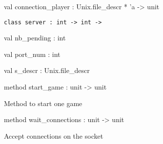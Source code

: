\documentclass[11pt]{article}
\begin{document}
\label{val:Server.connection-underscoreplayer}\begin{ocamldoccode}
val connection_player : Unix.file_descr * 'a -> unit
\end{ocamldoccode}




\begin{ocamldoccode}
{\tt{class server : }}{\tt{int -> int -> }}\end{ocamldoccode}
\label{class:Server.server}

\begin{ocamldocobjectend}


\label{val:Server.server.nb-underscorepending}\begin{ocamldoccode}
val nb_pending : int
\end{ocamldoccode}


\label{val:Server.server.port-underscorenum}\begin{ocamldoccode}
val port_num : int
\end{ocamldoccode}


\label{val:Server.server.s-underscoredescr}\begin{ocamldoccode}
val s_descr : Unix.file_descr
\end{ocamldoccode}


\label{method:Server.server.start-underscoregame}\begin{ocamldoccode}
method start_game : unit -> unit
\end{ocamldoccode}
\begin{ocamldocdescription}
Method to start one game


\end{ocamldocdescription}


\label{method:Server.server.wait-underscoreconnections}\begin{ocamldoccode}
method wait_connections : unit -> unit
\end{ocamldoccode}
\begin{ocamldocdescription}
Accept connections on the socket


\end{ocamldocdescription}
\end{ocamldocobjectend}
\end{document}
